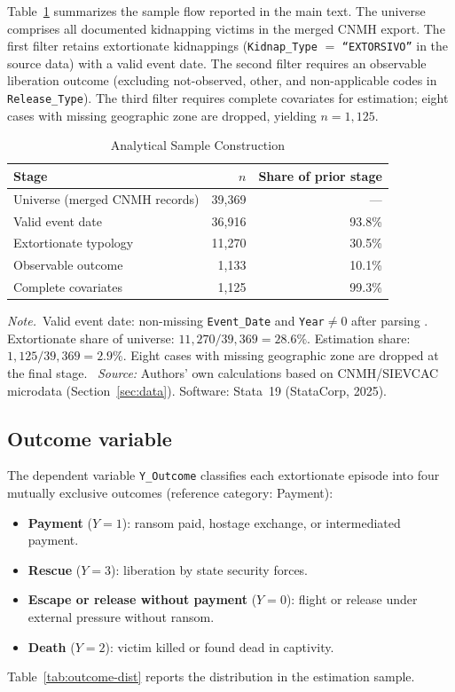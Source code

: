 \documentclass[12pt]{article}
\numberwithin{equation}{section}
\numberwithin{table}{section}
\newcommand{\tabnote}{\par\addvspace{0.4em}\noindent\emph{Note.}}
\newcommand{\tabsource}{\ \textit{Source:} Authors' own calculations based on
CNMH/SIEVCAC microdata (Section~\ref{sec:data}). Software: Stata~19
(StataCorp, 2025).}
\begin{document}
Table~\ref{tab:sample-flow} summarizes the sample flow reported in the main
text. The universe comprises all documented kidnapping victims in the merged
CNMH export. The first filter retains extortionate kidnappings
(\texttt{Kidnap\_Type} $=$ \texttt{``EXTORSIVO''} in the source data) with a valid event date. The second
filter requires an observable liberation outcome (excluding not-observed,
other, and non-applicable codes in \texttt{Release\_Type}). The third
filter requires complete covariates for estimation; eight cases with missing
geographic zone are dropped, yielding $n=1{,}125$.

\begin{table}[t]
\centering
\caption{Analytical Sample Construction}
\label{tab:sample-flow}
\begin{tabular}{@{}lrr@{}}
\toprule
Stage & $n$ & Share of prior stage \\
\midrule
Universe (merged CNMH records) & 39,369 & --- \\
Valid event date & 36,916 & 93.8\% \\
Extortionate typology & 11,270 & 30.5\% \\
Observable outcome & 1,133 & 10.1\% \\
Complete covariates & 1,125 & 99.3\% \\
\bottomrule
\end{tabular}
\tabnote\ Valid event date: non-missing \texttt{Event\_Date} and \texttt{Year}$\neq 0$
after parsing . Extortionate share of universe:
$11{,}270/39{,}369=28.6\%$. Estimation share: $1{,}125/39{,}369=2.9\%$. Eight
cases with missing geographic zone are dropped at the final stage.
\tabsource
\end{table}

\subsection{Outcome variable}

The dependent variable \texttt{Y\_Outcome} classifies each extortionate
episode into four mutually exclusive outcomes (reference category: Payment):
\begin{itemize}
\item \textbf{Payment} ($Y=1$): ransom paid, hostage exchange, or
  intermediated payment.
\item \textbf{Rescue} ($Y=3$): liberation by state security forces.
\item \textbf{Escape or release without payment} ($Y=0$):
  flight or release under external pressure without ransom.
\item \textbf{Death} ($Y=2$): victim killed or found dead in captivity.
\end{itemize}
Table~\ref{tab:outcome-dist} reports the distribution in the estimation
sample.
\end{document}
